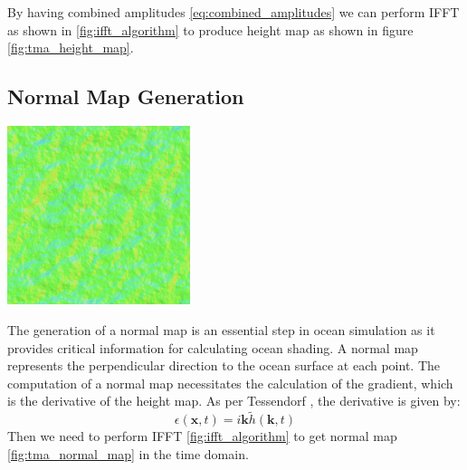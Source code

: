 By having combined amplitudes \ref{eq:combined_amplitudes} we can perform IFFT as shown in \ref{fig:ifft_algorithm} to produce height map as shown in figure \ref{fig:tma_height_map}.

\subsection{Normal Map Generation}
\begin{minipage}{1\textwidth}
    \centering
    \includegraphics[width=0.40\textwidth]{"images/tma_normal.png"}
    \label{fig:tma_normal_map}
\end{minipage}

The generation of a normal map is an essential step in ocean simulation as it provides critical information for calculating ocean shading. A normal map represents the perpendicular direction to the ocean surface at each point.
The computation of a normal map necessitates the calculation of the gradient, which is the derivative of the height map. As per Tessendorf \cite{tessendorf2004}, the derivative is given by:
\begin{equation}
    \epsilon(\textbf{x}, t) = i\textbf{k} \tilde{h}(\textbf{k}, t)
\end{equation}
Then we need to perform IFFT \ref{fig:ifft_algorithm} to get normal map \ref{fig:tma_normal_map} in the time domain.

